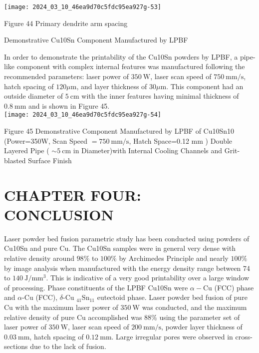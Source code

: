 \documentclass[10pt]{article}
\begin{document}
\begin{center}
\texttt{[image: 2024\_03\_10\_46ea9d70c5fdc95ea927g-53]}
\end{center}

Figure 44 Primary dendrite arm spacing

Demonstrative Cu10Sn Component Manufactured by LPBF

In order to demonstrate the printability of the Cu10Sn powders by LPBF, a pipe-like component with complex internal features was manufactured following the recommended parameters: laser power of $350 \mathrm{~W}$, laser scan speed of $750 \mathrm{~mm} / \mathrm{s}$, hatch spacing of $120 \mu \mathrm{m}$, and layer thickness of $30 \mu \mathrm{m}$. This component had an outside diameter of $5 \mathrm{~cm}$ with the inner features having minimal thickness of $0.8 \mathrm{~mm}$ and is shown in Figure 45.\\
\texttt{[image: 2024\_03\_10\_46ea9d70c5fdc95ea927g-54]}

Figure 45 Demonstrative Component Manufactured by LPBF of Cu10Sn10 (Power=350W, Scan Speed $=750 \mathrm{~mm} / \mathrm{s}$, Hatch Space=0.12 $\mathrm{mm}$ ) Double Layered Pipe ( $\sim 5 \mathrm{~cm}$ in Diameter)with Internal Cooling Channels and Grit-blasted Surface Finish

\section*{CHAPTER FOUR: CONCLUSION}
Laser powder bed fusion parametric study has been conducted using powders of Cu10Sn and pure $\mathrm{Cu}$. The Cu10Sn samples were in general very dense with relative density around $98 \%$ to $100 \%$ by Archimedes Principle and nearly $100 \%$ by image analysis when manufactured with the energy density range between 74 to $140 \mathrm{~J} / \mathrm{mm}^{3}$. This is indicative of a very good printability over a large window of processing. Phase constituents of the LPBF Cu10Sn were $\alpha-\mathrm{Cu}$ (FCC) phase and $\alpha$-Cu (FCC), $\delta$-Cu ${ }_{41} \mathrm{Sn}_{11}$ eutectoid phase. Laser powder bed fusion of pure $\mathrm{Cu}$ with the maximum laser power of $350 \mathrm{~W}$ was conducted, and the maximum relative density of pure $\mathrm{Cu}$ accomplished was $88 \%$ using the parameter set of laser power of $350 \mathrm{~W}$, laser scan speed of $200 \mathrm{~mm} / \mathrm{s}$, powder layer thickness of $0.03 \mathrm{~mm}$, hatch spacing of $0.12 \mathrm{~mm}$. Large irregular pores were observed in cross-sections due to the lack of fusion.
\end{document}
